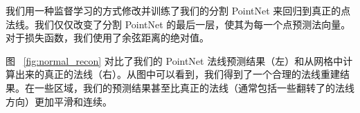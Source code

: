 

我们用一种监督学习的方式修改并训练了我们的分割 PointNet 来回归到真正的点法线。我们仅仅改变了分割 PointNet 的最后一层，使其为每一个点预测法向量。对于损失函数，我们使用了余弦距离的绝对值。


图 ~\ref{fig:normal_recon} 对比了我们的 PointNet 法线预测结果（左）和从网格中计算出来的真正的法线（右）。从图中可以看到，我们得到了一个合理的法线重建结果。在一些区域，我们的预测结果甚至比真正的法线（通常包括一些翻转了的法线方向）更加平滑和连续。


